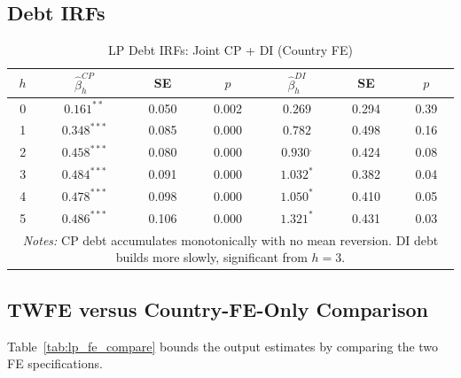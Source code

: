 \documentclass[12pt, a4paper]{article}
\begin{document}
\subsection{Debt IRFs}

\begin{table}[htbp]
\centering
\caption{LP Debt IRFs: Joint CP + DI (Country FE)}
\label{tab:lp_debt}
\small
\begin{tabular}{ccccccc}
\toprule
$h$ & $\hat{\beta}_h^{CP}$ & SE & $p$ & $\hat{\beta}_h^{DI}$ & SE & $p$ \\
\midrule
0 & $0.161^{**}$  & 0.050 & 0.002 & $0.269$      & 0.294 & 0.39 \\
1 & $0.348^{***}$ & 0.085 & 0.000 & $0.782$      & 0.498 & 0.16 \\
2 & $0.458^{***}$ & 0.080 & 0.000 & $0.930^{.}$  & 0.424 & 0.08 \\
3 & $0.484^{***}$ & 0.091 & 0.000 & $1.032^{*}$  & 0.382 & 0.04 \\
4 & $0.478^{***}$ & 0.098 & 0.000 & $1.050^{*}$  & 0.410 & 0.05 \\
5 & $0.486^{***}$ & 0.106 & 0.000 & $1.321^{*}$  & 0.431 & 0.03 \\
\bottomrule
\multicolumn{7}{p{11cm}}{\footnotesize \textit{Notes:} CP debt accumulates monotonically with no mean reversion. DI debt builds more slowly, significant from $h = 3$.} \\
\end{tabular}
\end{table}

\subsection{TWFE versus Country-FE-Only Comparison}

Table~\ref{tab:lp_fe_compare} bounds the output estimates by comparing the two FE specifications.
\end{document}
